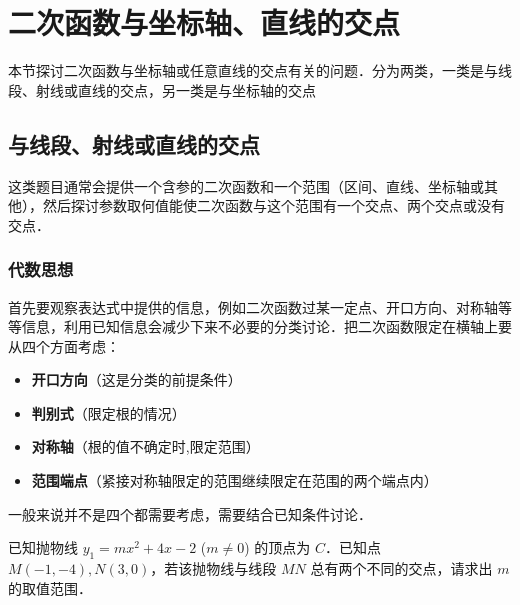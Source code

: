 \section{二次函数与坐标轴、直线的交点}

本节探讨二次函数与坐标轴或任意直线的交点有关的问题．分为两类，一类是与线段、射线或直线的交点，另一类是与坐标轴的交点
\subsection{与线段、射线或直线的交点}
这类题目通常会提供一个含参的二次函数和一个范围（区间、直线、坐标轴或其他），然后探讨参数取何值能使二次函数与这个范围有一个交点、两个交点或没有交点．
\subsubsection*{代数思想}






首先要观察表达式中提供的信息，例如二次函数过某一定点、开口方向、对称轴等等信息，利用已知信息会减少下来不必要的分类讨论．把二次函数限定在横轴上要从四个方面考虑：
\begin{itemize}
    \item \textbf{开口方向}（这是分类的前提条件）
    \item \textbf{判别式}（限定根的情况）
    \item \textbf{对称轴}（根的值不确定时,限定范围）
    \item \textbf{范围端点}（紧接对称轴限定的范围继续限定在范围的两个端点内）
\end{itemize}

一般来说并不是四个都需要考虑，需要结合已知条件讨论．


\begin{example}
已知抛物线 \( y_1 = mx^2 + 4x - 2 \) (\( m \neq 0 \)) 的顶点为 \( C \)．已知点 \( M(-1, -4), N(3, 0) \)，若该抛物线与线段 \( MN \) 总有两个不同的交点，请求出 \( m \) 的取值范围．
\end{example}

